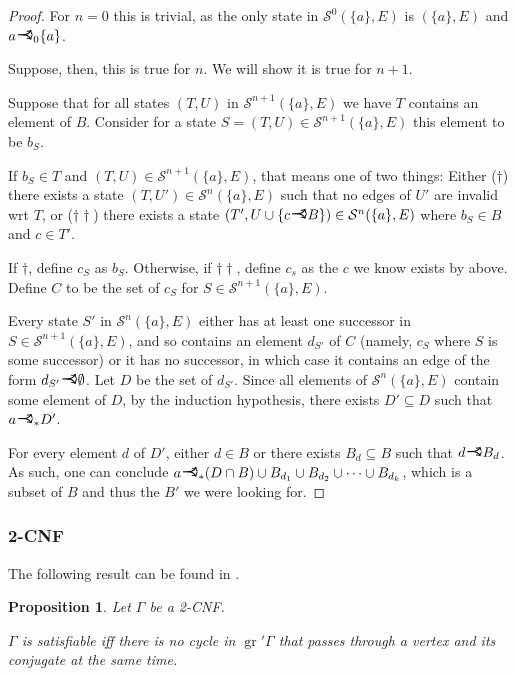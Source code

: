 \documentclass[11pt]{article}
\newcommand{\cS}{\mathcal{S}}
\DeclareMathOperator{\gr}{gr}
\newcommand{\rightcurveor}{
\!
\mathrel{
  \begin{tikzpicture}[scale=0.8]
    \draw[thick,->] (0,0) arc (90:150:-2ex);
    \draw[thick,->] (0,0) arc (90:30:2ex);
    \draw[thick] (-1ex, 0) -- (0.1ex,0);
  \end{tikzpicture}
}\!
}
\newtheorem*{prop*}{Proposition}
\begin{document}
\begin{proof}
For $n = 0$ this is trivial, as the only state in $\cS^0 (\{a\}, E)$ is $(\{a\}, E)$ and $a \rightcurveor_0 \{a\}$.

Suppose, then, this is true for $n$. We will show it is true for $n+1$.

Suppose that for all states $(T,U)$ in $\cS^{n+1} (\{a\}, E)$ we have $T$ contains an element of $B$. Consider for a state $S = (T,U) \in \cS^{n+1} (\{a\}, E)$ this element to be $b_S$.

If $b_S \in T$ and $(T,U) \in \cS^{n+1} (\{a\}, E)$, that means one of two things: Either ($\dag$) there exists a state $(T, U') \in \cS^n (\{a\}, E)$ such that no edges of $U'$ are invalid wrt $T$, or ($\dag\dag$) there exists a state $(T',U \cup \{c \rightcurveor B\}) \in \cS^n (\{a\}, E)$ where $b_S \in B$ and $c \in T'$.

If $\dag$, define $c_S$ as $b_S$. Otherwise, if $\dag\dag$, define $c_s$ as the $c$ we know exists by above. Define $C$ to be the set of $c_S$ for $S \in \cS^{n+1} (\{a\}, E)$.

Every state $S'$ in $\cS^n (\{a\}, E)$ either has at least one successor in $S \in \cS^{n+1} (\{a\}, E)$, and so contains an element $d_{S'}$ of $C$ (namely, $c_S$ where $S$ is some successor) or it has no successor, in which case it contains an edge of the form $d_{S'} \rightcurveor \emptyset$. Let $D$ be the set of $d_{S'}$. Since all elements of $\cS^n (\{a\}, E)$ contain some element of $D$, by the induction hypothesis, there exists $D' \subseteq D$ such that $a \rightcurveor_* D'$.

For every element $d$ of $D'$, either $d \in B$ or there exists $B_d \subseteq B$ such that $d \rightcurveor B_d$. As such, one can conclude $a \rightcurveor_* (D \cap B) \cup B_{d_1} \cup B_{d_2} \cup \cdots \cup B_{d_k}$, which is a subset of $B$ and thus the $B'$ we were looking for.

\end{proof}

\subsubsection{2-CNF}

The following result can be found in \cite{2cnf}.

\begin{prop*}
Let $\Gamma$ be a 2-CNF.

$\Gamma$ is satisfiable iff there is no cycle in $\gr' \Gamma$ that passes through a vertex and its conjugate at the same time.
\end{prop*}
\end{document}
